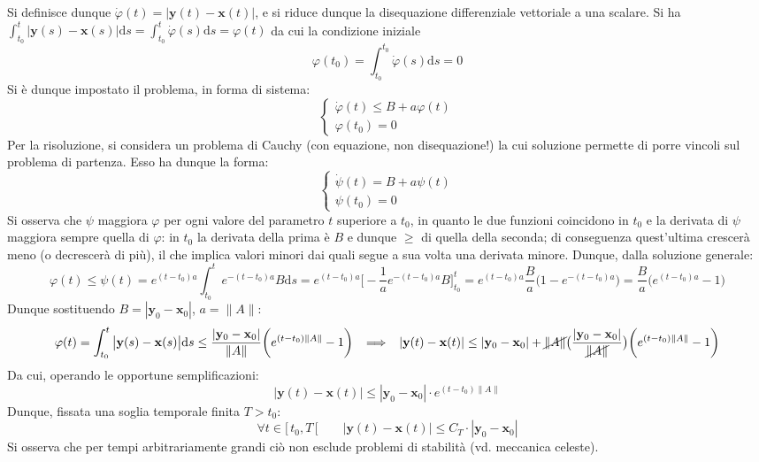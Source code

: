 \documentclass[10pt, oneside]{book}
\theoremstyle{plain}
\begin{document}
Si definisce dunque $\displaystyle \dot{\varphi}(t) = \big|\mathbf{y}(t) - \mathbf{x}(t)\big|$, e si riduce dunque la disequazione differenziale vettoriale a una scalare. Si ha $\displaystyle \int_{t_0}^{t} \big| \mathbf{y}(s) - \mathbf{x}(s)\big| \textrm{d}s = \int_{t_0}^{t} \dot{\varphi}(s)\textrm{d}s = \varphi(t)$ da cui la condizione iniziale
\[\varphi(t_0) = \int_{t_0}^{t_0} \dot{\varphi}(s) \textrm{d}s = 0\]
Si è dunque impostato il problema, in forma di sistema:
\[\begin{cases}
\dot{\varphi}(t) \leq B + a \varphi(t)\\
\varphi(t_0) = 0
\end{cases}\]
Per la risoluzione, si considera un problema di Cauchy (con equazione, non disequazione!) la cui soluzione permette di porre vincoli sul problema di partenza. Esso ha dunque la forma:
\[\begin{cases}
\dot{\psi}(t) = B + a \psi(t)\\
\psi(t_0) = 0
\end{cases}\]
Si osserva che $\psi$ maggiora $\varphi$ per ogni valore del parametro $t$ superiore a $t_0$, in quanto le due funzioni coincidono in $t_0$ e la derivata di $\psi$ maggiora sempre quella di $\varphi$: in $t_0$ la derivata della prima è $B$ e dunque $\geq$ di quella della seconda; di conseguenza quest'ultima crescerà meno (o decrescerà di più), il che implica valori minori dai quali segue a sua volta una derivata minore. Dunque, dalla soluzione generale:
\[\varphi(t) \leq \psi(t) = e^{(t - t_0) a} \int_{t_0}^{t}e^{- (t - t_0) a}B \textrm{d}s = e^{(t - t_0) a} \bigg[-\frac{1}{a}e^{- (t - t_0) a} B\bigg]_{t_0}^t = e^{(t - t_0) a} \frac{B}{a} \big(1 - e^{- (t - t_0) a}\big) = \frac{B}{a}\big(e^{(t - t_0) a} - 1\big)\]
Dunque sostituendo $\displaystyle B = |\mathbf{y}_0 - \mathbf{x}_0|$, $a = \|A\|$:
\[\varphi(t) = \int_{t_0}^{t} \big| \mathbf{y}(s) - \mathbf{x}(s)\big| \textrm{d}s \leq \frac{|\mathbf{y}_0 - \mathbf{x}_0|}{\|A\|} \bigg(e^{(t - t_0) \|A\|} - 1\bigg) \enspace \implies \enspace |\mathbf{y}(t) - \mathbf{x}(t)| \leq |\mathbf{y}_0 - \mathbf{x}_0| + \cancel{\|A\|} \big(\frac{|\mathbf{y}_0 - \mathbf{x}_0|}{\cancel{\|A\|}}\big)\bigg(e^{(t - t_0) \|A\|} - 1\bigg)\]
Da cui, operando le opportune semplificazioni:
\[|\mathbf{y}(t) - \mathbf{x}(t)| \leq |\mathbf{y}_0 - \mathbf{x}_0| \cdot e^{(t - t_0) \|A\|}\]
Dunque, fissata una soglia temporale finita $T > t_0$:
\[\forall t \in \big[ \, t_0, T \, \big[ \qquad |\mathbf{y}(t) - \mathbf{x}(t)| \leq C_T \cdot |\mathbf{y}_0 - \mathbf{x}_0|\]
Si osserva che per tempi arbitrariamente grandi ciò non esclude problemi di stabilità (vd. meccanica celeste).
\end{document}
